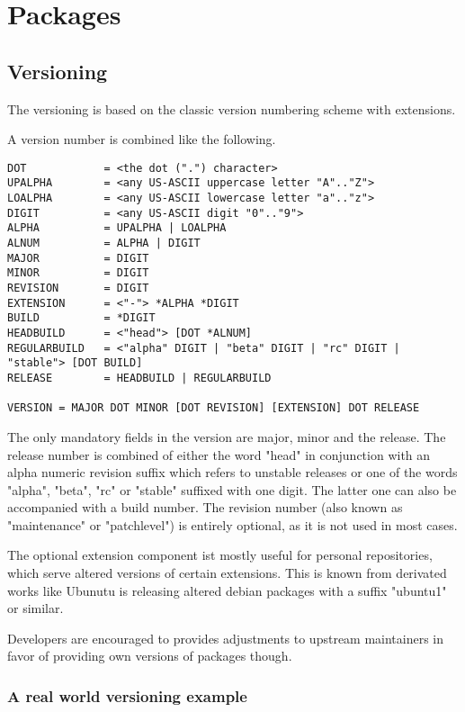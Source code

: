 \chapter{Packages}

\section[sec:versioning]{Versioning}
The versioning is based on the classic version numbering scheme with extensions.

A version number is combined like the following.

\begin{lstlisting}[caption=Version number in EBNF]
DOT            = <the dot (".") character>
UPALPHA        = <any US-ASCII uppercase letter "A".."Z">
LOALPHA        = <any US-ASCII lowercase letter "a".."z">
DIGIT          = <any US-ASCII digit "0".."9">
ALPHA          = UPALPHA | LOALPHA
ALNUM          = ALPHA | DIGIT
MAJOR          = DIGIT
MINOR          = DIGIT
REVISION       = DIGIT
EXTENSION      = <"-"> *ALPHA *DIGIT
BUILD          = *DIGIT
HEADBUILD      = <"head"> [DOT *ALNUM]
REGULARBUILD   = <"alpha" DIGIT | "beta" DIGIT | "rc" DIGIT | "stable"> [DOT BUILD]
RELEASE        = HEADBUILD | REGULARBUILD

VERSION = MAJOR DOT MINOR [DOT REVISION] [EXTENSION] DOT RELEASE
\end{lstlisting}

The only mandatory fields in the version are major, minor and the release. 
The release number is combined of either the word "head" in conjunction with an alpha numeric revision suffix which refers to unstable releases or one of the words "alpha", "beta", "rc" or "stable" suffixed with one digit. The latter one can also be accompanied with a build number.
The revision number (also known as "maintenance" or "patchlevel") is entirely optional, as it is not used in most cases.

The optional extension component ist mostly useful for personal repositories, which serve altered versions of certain extensions. This is known from derivated works like Ubunutu is releasing altered debian packages with a suffix "ubuntu1" or similar.

Developers are encouraged to provides adjustments to upstream maintainers in favor of providing own versions of packages though.

\subsection[sec:versioning real word examples]{A real world versioning example}

